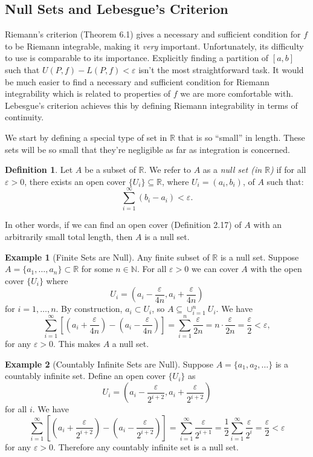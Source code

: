 \documentclass{article}
\newcommand{\N}{\mathbb{N}}
\newcommand{\R}{\mathbb{R}}
\theoremstyle{definition}
\newtheorem{definition}{Definition}[section]
\newtheorem{example}{Example}[section]
\begin{document}
	\subsection{Null Sets and Lebesgue's Criterion}
	Riemann's criterion (Theorem 6.1) gives a necessary and sufficient condition for $ f $ to be Riemann integrable, making it \textit{very} important. Unfortunately, its difficulty to use is comparable to its importance. Explicitly finding a partition of $ [a,b] $ such that $ U(P,f)-L(P,f)<\varepsilon $ isn't the most straightforward task. It would be much easier to find a necessary and sufficient condition for Riemann integrability which is related to properties of $ f $ we are more comfortable with. Lebesgue's criterion achieves this by defining Riemann integrability in terms of continuity. 
	
	We start by defining a special type of set in $ \R $ that is so ``small'' in length. These sets will be so small that they're negligible as far as integration is concerned. 
	\begin{definition}
		Let $ A $ be a subset of $ \R $. We refer to $ A $ as a \textit{\color{red}null set (in $ \R $)} if for all $ \varepsilon > 0 $, there exists an open cover $ \{U_i\}\subseteq \R $, where $ U_i=(a_i,b_i) $, of $ A $ such that:
		$$\sum_{i=1}^\infty (b_i-a_i) < \varepsilon .$$
	\end{definition}
	In other words, if we can find an open cover (Definition 2.17) of $ A $ with an arbitrarily small total length, then $ A $ is a null set. 
	\begin{example}[Finite Sets are Null]
		Any finite subset of $ \R $ is a null set. Suppose $ A = \{a_1,\ldots,a_n\} \subset \R $ for some $ n\in \N $. For all $ \varepsilon>0 $ we can cover $ A $ with the open cover $ \{U_i\} $ where $$ U_i = \left(a_i-\frac{\varepsilon}{4n}, a_i+\frac{\varepsilon}{4n}\right) $$ for $ i=1,\ldots, n $. By construction, $ a_i \subset U_i $, so $ A \subseteq \cup_{i=1}^n U_i $. We have 
		$$\sum_{i=1}^{\infty} \left[\left(a_i+\frac{\varepsilon}{4n}\right) - \left(a_i-\frac{\varepsilon}{4n}\right)\right] = \sum_{i=1}^{n}\frac{\varepsilon}{2n}=n\cdot \frac{\varepsilon}{2n}=\frac{\varepsilon}{2}<\varepsilon,$$ for any $ \varepsilon > 0 $. This makes $ A $ a null set. 
	\end{example}
	\begin{example}[Countably Infinite Sets are Null]
		Suppose $ A=\{a_1,a_2,\ldots\} $ is a countably infinite set. Define an open cover $ \{U_i\} $ as $$ U_i = \left(a_i-\frac{\varepsilon}{2^{i+2}}, a_i+\frac{\varepsilon}{2^{i+2}}\right)$$ for all $ i $.  
		We have	$$\sum_{i=1}^{\infty} \left[\left(a_i+\frac{\varepsilon}{2^{i+2}}\right) - \left(a_i-\frac{\varepsilon}{2^{i+2}}\right)\right] = \sum_{i=1}^{\infty} \frac{\varepsilon}{2^{i+1}} = \frac{1}{2}\sum_{i=1}^{\infty} \frac{\varepsilon}{2^{i}}=\frac{\varepsilon}{2}< \varepsilon$$ for any $ \varepsilon >0 $. Therefore any countably infinite set is a null set.
	\end{example}
\end{document}
